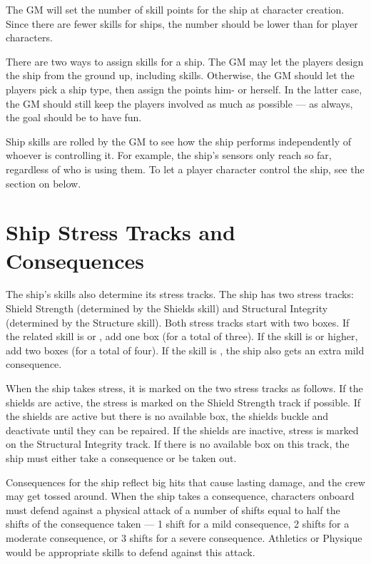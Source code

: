 \documentclass[12pt,titlepage,openany]{book}
\begin{document}
The GM will set the number of skill points for the ship at character creation.
Since there are fewer skills for ships, the number should be lower than for
player characters.

There are two ways to assign skills for a ship. The GM may let the players design
the ship from the ground up, including skills. Otherwise, the GM should let the
players pick a ship type, then assign the points him- or herself. In the latter
case, the GM should still keep the players involved as much as possible --- as
always, the goal should be to have fun.

Ship skills are rolled by the GM to see how the ship performs independently of
whoever is controlling it. For example, the ship's sensors only reach so far,
regardless of who is using them. To let a player character control the ship, see
the section on  below.

\section{Ship Stress Tracks and Consequences}\label{sec:ship-stress}

The ship's skills also determine its stress tracks. The ship has two stress
tracks: Shield Strength (determined by the Shields skill) and Structural
Integrity (determined by the Structure skill). Both stress tracks start with
two boxes. If the related skill is  or , add one box
(for a total of three). If the skill is  or higher, add two boxes
(for a total of four). If the skill is , the ship also gets an
extra mild consequence.

When the ship takes stress, it is marked on the two stress tracks as follows.
If the shields are active, the stress is marked on the Shield Strength track if
possible. If the shields are active but there is no available box, the shields
buckle and deactivate until they can be repaired. If the shields are inactive,
stress is marked on the Structural Integrity track. If there is no available
box on this track, the ship must either take a consequence or be taken out.

Consequences for the ship reflect big hits that cause lasting damage, and the
crew may get tossed around. When the ship takes a consequence, characters
onboard must defend against a physical attack of a number of shifts equal to
half the shifts of the consequence taken --- 1 shift for a mild consequence, 2
shifts for a moderate consequence, or 3 shifts for a severe consequence.
Athletics or Physique would be appropriate skills to defend against this
attack.
\end{document}
